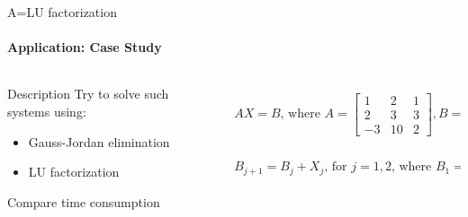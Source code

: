 \documentclass[aspectratio=169]{beamer}
\begin{document}
\begin{frame}[t]{A=LU factorization}
    \framesubtitle{Application: Case Study}
    \vspace{-0.6cm}
    \begin{columns}[T,onlytextwidth]
        \begin{column}{0.49\textwidth}
            \begin{block}{Description}
                Try to solve such systems using:
                \begin{itemize}
                    \item Gauss-Jordan elimination
                    \item LU factorization
                \end{itemize}
                Compare time consumption
            \end{block}
        \end{column}
        \begin{column}{0.49\textwidth}
            \begin{eqnarray*}
                AX=B \text{, where } A = \begin{bmatrix}
                    1  & 2  & 1 \\
                    2  & 3  & 3 \\
                    -3 & 10 & 2
                \end{bmatrix}, B = \begin{bmatrix}
                    k_1 \\k_2\\k_3
                \end{bmatrix} \\
                B_{j+1} = B_j + X_j \text{, for $j=1,2$, where }B_1= \begin{bmatrix}
                    1 \\1\\1
                \end{bmatrix}
            \end{eqnarray*}
        \end{column}
    \end{columns}
    \vspace{-0.8cm}
\end{frame}
\end{document}

